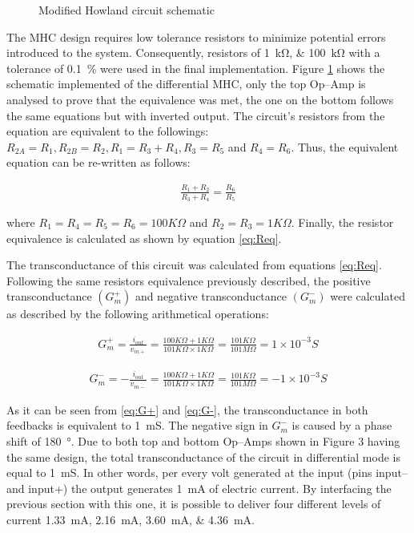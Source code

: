 
\begin{figure}
	\label{fig:mhc}
	\caption{Modified Howland circuit schematic}
\end{figure}

The MHC design requires low tolerance resistors to minimize potential errors introduced to the system. Consequently, resistors of \SIlist{1;100}{\kohm} with a tolerance of \SI{0.1}{\percent} were used in the final implementation. Figure \ref{fig:mhc} shows the schematic implemented of the differential MHC, only the top Op–Amp is analysed to prove that the equivalence was met, the one on the bottom follows the same equations but with inverted output. The circuit’s resistors from the equation are equivalent to the followings: $R_{2A}=R_1, R_{2B}=R_2, R_1 = R_3 + R_4, R_3 = R_5$ and $R_4 = R_6$. Thus, the equivalent equation can be re-written as follows: 

\begin{align}
\label{eq:Req}
\frac{R_1 + R_2}{R_3 + R_4} = \frac{R_6}{R_5}
\end{align}

where $R_1=R_4=R_5=R_6=100K\Omega$ and $R_2=R_3=1K\Omega$. Finally, the resistor equivalence is calculated as shown by equation \ref{eq:Req}. 

The transconductance of this circuit was calculated from equations \ref{eq:Req}. Following the same resistors equivalence previously described, the positive  transconductance $(G^+_m)$ and negative transconductance $(G^-_m)$ were calculated as described by the following arithmetical operations:


\begin{align}
\label{eq:G+}
G^+_m=\frac{i_{out}}{v_{in+}}=\frac{100K\Omega + 1K\Omega}{101K\Omega \times 1K\Omega}=\frac{101K\Omega}{101M\Omega}=1\times10^{-3}S 
\end{align}

\begin{align}
\label{eq:G-}
G^-_m=-\frac{i_{out}}{v_{in-}}=\frac{100K\Omega + 1K\Omega}{101K\Omega \times 1K\Omega}=\frac{101K\Omega}{101M\Omega}=-1\times10^{-3}S 
\end{align}

As it can be seen from \ref{eq:G+} and \ref{eq:G-}, the transconductance in both feedbacks is equivalent to \SI{1}{\milli\siemens}. The negative sign in $G^{-}_m$ is caused by a phase shift of \SI{180}{\degree}. Due to both top and bottom Op–Amps shown in Figure 3 having the same design, the total transconductance of the circuit in differential mode is equal to \SI{1}{\milli\siemens}. In other words, per every volt generated at the input (pins input– and input+) the output generates \SI{1}{\mA} of electric current. By interfacing the previous section with this one, it is possible to deliver four different levels of current \SIlist{1.33;2.16;3.60;4.36}{\mA}.

